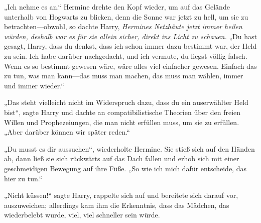 „Ich nehme es an.“
Hermine drehte den Kopf wieder, um auf das Gelände unterhalb von Hogwarts zu blicken, denn die Sonne war jetzt zu hell, um sie zu betrachten—obwohl, so dachte Harry, \emph{Hermines Netzhäute jetzt immer heilen würden, deshalb war es für sie allein sicher, direkt ins Licht zu schauen.}
„Du hast gesagt, Harry, dass du denkst, dass ich schon immer dazu bestimmt war, der Held zu sein. Ich habe darüber nachgedacht, und ich vermute, du liegst völlig falsch. Wenn es so bestimmt gewesen wäre, wäre alles viel einfacher gewesen. Einfach das zu tun, was man kann—das muss man machen, das muss man wählen, immer und immer wieder.“

„Das steht vielleicht nicht im Widerspruch dazu, dass du ein auserwählter Held bist“, sagte Harry und dachte an compatibilistische Theorien über den freien Willen und Prophezeiungen, die man nicht erfüllen muss, um sie zu erfüllen.
„Aber darüber können wir später reden.“

„Du musst es dir aussuchen“, wiederholte Hermine.
Sie stieß sich auf den Händen ab, dann ließ sie sich rückwärts auf das Dach fallen und erhob sich mit einer geschmeidigen Bewegung auf ihre Füße.
„So wie ich mich dafür entscheide, das hier zu tun.“

„Nicht küssen!“ sagte Harry, rappelte sich auf und bereitete sich darauf vor, auszuweichen; allerdings kam ihm die Erkenntnis, dass das Mädchen, das wiederbelebt wurde, viel, viel schneller sein würde.

